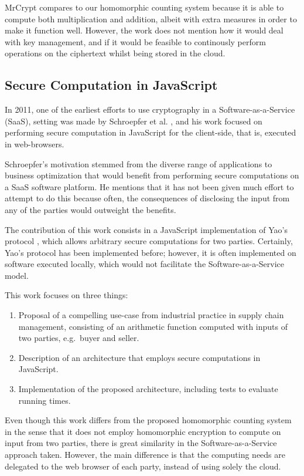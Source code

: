 MrCrypt compares to our homomorphic counting system because it is able to compute both multiplication and addition, albeit with extra measures in order to make it function well. However, the work does not mention how it would deal with key management, and if it would be feasible to continously perform operations on the ciphertext whilst being stored in the cloud.

\subsection{Secure Computation in JavaScript}

In 2011, one of the earliest efforts to use cryptography in a Software-as-a-Service (SaaS), setting was made by Schroepfer et al. \cite{Schroepfer:2011:DSC:2046707.2093509}, and his work focused on performing secure computation in JavaScript for the client-side, that is, executed in web-browsers.

Schroepfer's motivation stemmed from the diverse range of applications to business optimization that would benefit from performing secure computations on a SaaS software platform. He mentions that it has not been given much effort to attempt to do this because often, the consequences of disclosing the input from any of the parties would outweight the benefits.

The contribution of this work consists in a JavaScript implementation of Yao's protocol \cite{Yao:1986:GES:1382439.1382944}, which allows arbitrary secure computations for two parties. Certainly, Yao's protocol has been implemented before; however, it is often implemented on software executed locally, which would not facilitate the Software-as-a-Service model.

This work focuses on three things:
\begin{enumerate}
\item Proposal of a compelling use-case from industrial practice in supply chain management, consisting of an arithmetic function computed with inputs of two parties, e.g.\ buyer and seller.
\item Description of an architecture that employs secure computations in JavaScript.
\item Implementation of the proposed architecture, including tests to evaluate running times.
\end{enumerate}
   
Even though this work differs from the proposed homomorphic counting system in the sense that it does not employ homomorphic encryption to compute on input from two parties, there is great similarity in the Software-as-a-Service approach taken. However, the main difference is that the computing needs are delegated to the web browser of each party, instead of using solely the cloud.

